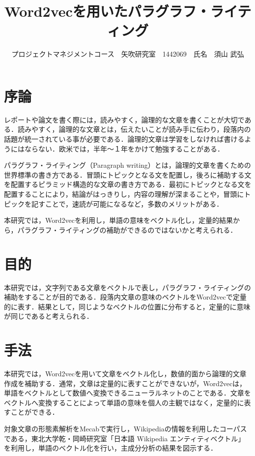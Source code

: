 \documentclass[uplatex,twocolumn,dvipdfmx]{jsarticle}
\title{\vspace{-5mm}\fontsize{14pt}{0pt}\selectfont Word2vecを用いたパラグラフ・ライティング}
\author{\normalsize プロジェクトマネジメントコース　矢吹研究室　1442069　氏名　須山 武弘}
\date{}
\begin{document}
\fontsize{10.5pt}{\baselineskip}\selectfont
\maketitle





\section{序論}\label{序論}

レポートや論文を書く際には，読みやすく，論理的な文章を書くことが大切である．読みやすく，論理的な文章とは，伝えたいことが読み手に伝わり，段落内の話題が統一されている事が必要である．論理的文章は学習をしなければ書けるようにはならない．欧米では，半年～１年をかけて勉強することがある．

パラグラフ・ライティング（Paragraph writing）とは，論理的文章を書くための世界標準の書き方である\cite{02}．冒頭にトピックとなる文を配置し，後ろに補助する文を配置するピラミッド構造的な文章の書き方である．最初にトピックとなる文を配置することにより，結論がはっきりし，内容の理解が深まることや，冒頭にトピックを記すことで，速読が可能になるなど，多数のメリットがある．

本研究では，Word2vecを利用し，単語の意味をベクトル化し，定量的結果から，パラグラフ・ライティングの補助ができるのではないかと考えられる\cite{01}．

\section{目的}
本研究では，文字列である文章をベクトルで表し，パラグラフ・ライティングの補助をすることが目的である．段落内文章の意味のベクトルをWord2vecで定量的に表す．結果として，同じようなベクトルの位置に分布すると，定量的に意味が同じであると考えられる．

\section{手法}

本研究では，Word2vecを用いて文章をベクトル化し，数値的面から論理的文章作成を補助する．通常，文章は定量的に表すことができないが，Word2vecは，単語をベクトルとして数値へ変換できるニューラルネットのことである．文章をベクトルへ変換することによって単語の意味を個人の主観ではなく，定量的に表すことができる．

対象文章の形態素解析をMecabで実行し，Wikipediaの情報を利用したコーパスである，東北大学乾・岡崎研究室「日本語 Wikipedia エンティティベクトル」を利用し，単語のベクトル化を行い，主成分分析の結果を図示する．
\end{document}
